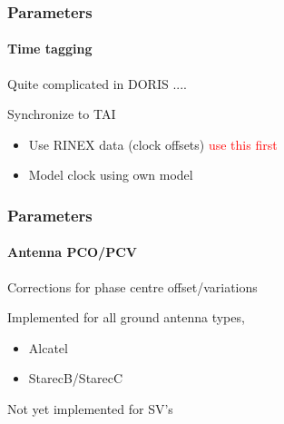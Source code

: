 \documentclass{beamer}
\begin{document}
\begin{frame}\frametitle{Parameters}\framesubtitle{Time tagging}
    Quite complicated in DORIS ....
    \vspace{.3cm}

    Synchronize to TAI\\
    \vspace{.3cm}

  \begin{itemize}
      \item Use RINEX data (clock offsets) \textcolor{red}{use this first}
      \item Model clock using own model
  \end{itemize}
    \vspace{.3cm}

\end{frame}

\begin{frame}\frametitle{Parameters}\framesubtitle{Antenna PCO/PCV}
    Corrections for phase centre offset/variations\\
    \vspace{.3cm}

  Implemented for all ground antenna types,
  \begin{itemize}
      \item Alcatel
      \item StarecB/StarecC
  \end{itemize}
  \vspace{.3cm}

  Not yet implemented for SV's
  \vspace{.3cm}

\end{frame}


\end{document}
